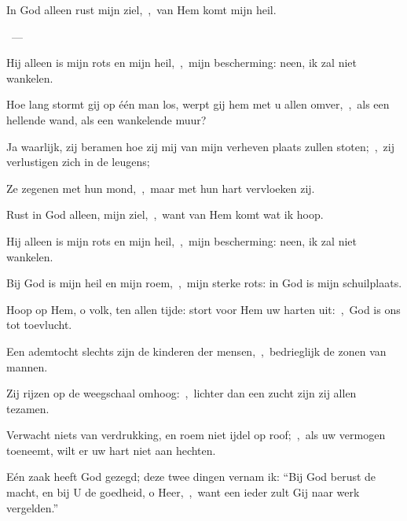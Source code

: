 \documentclass[12pt,twoside,a5paper]{article}
\begin{document}

\begin{halfparskip}
   In God alleen rust mijn ziel,~\sep\ van Hem komt mijn heil.

  ~--- 

  Hij alleen is mijn rots en mijn heil,~\sep\ mijn bescherming: neen, ik zal niet wankelen.

  Hoe lang stormt gij op één man los, werpt gij hem met u allen omver,~\sep\ als een hellende wand, als een
  wankelende muur?

  Ja waarlijk, zij beramen hoe zij mij van mijn verheven plaats zullen stoten;~\sep\ zij verlustigen zich in de leugens;

  Ze zegenen met hun mond,~\sep\ maar met hun hart vervloeken zij.

  Rust in God alleen, mijn ziel,~\sep\ want van Hem komt wat ik hoop.

  Hij alleen is mijn rots en mijn heil,~\sep\ mijn bescherming: neen, ik zal niet wankelen.

  Bij God is mijn heil en mijn roem,~\sep\ mijn sterke rots: in God is mijn schuilplaats.

  Hoop op Hem, o volk, ten allen tijde: stort voor Hem uw harten uit:~\sep\ God is ons tot toevlucht.

  Een ademtocht slechts zijn de kinderen der mensen,~\sep\ bedrieglijk de zonen van mannen.

  Zij rijzen op de weegschaal omhoog:~\sep\ lichter dan een zucht zijn zij allen tezamen.

  Verwacht niets van verdrukking, en roem niet ijdel op roof;~\sep\ als uw vermogen toeneemt, wilt er uw hart niet aan hechten.

  Eén zaak heeft God gezegd; deze twee dingen vernam ik: ``Bij God berust de macht, en bij U de goedheid, o Heer,~\sep\ want een ieder zult Gij naar werk vergelden.''
\end{halfparskip}
\end{document}

